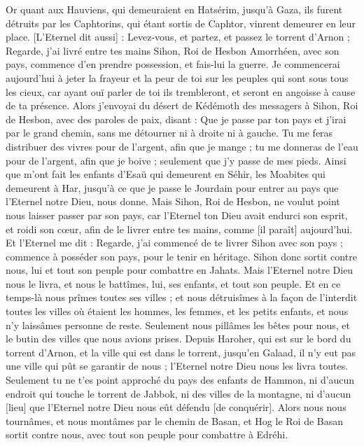 \begin{multicols}{2}
Or quant aux Hauviens, qui demeuraient en Hatsérim, jusqu'à Gaza, ils furent détruits par les Caphtorins, qui étant sortis de Caphtor, vinrent demeurer en leur place.
[L'Eternel dit aussi] : Levez-vous, et partez, et passez le torrent d'Arnon ; Regarde, j'ai livré entre tes mains Sihon, Roi de Hesbon Amorrhéen, avec son pays, commence d'en prendre possession, et fais-lui la guerre.
Je commencerai aujourd'hui à jeter la frayeur et la peur de toi sur les peuples qui sont sous tous les cieux, car ayant ouï parler de toi ils trembleront, et seront en angoisse à cause de ta présence.
Alors j'envoyai du désert de Kédémoth des messagers à Sihon, Roi de Hesbon, avec des paroles de paix, disant :
Que je passe par ton pays et j'irai par le grand chemin, sans me détourner ni à droite ni à gauche.
Tu me feras distribuer des vivres pour de l'argent, afin que je mange ; tu me donneras de l'eau pour de l'argent, afin que je boive ; seulement que j'y passe de mes pieds.
Ainsi que m'ont fait les enfants d'Esaü qui demeurent en Séhir, les Moabites qui demeurent à Har, jusqu'à ce que je passe le Jourdain pour entrer au pays que l'Eternel notre Dieu, nous donne.
Mais Sihon, Roi de Hesbon, ne voulut point nous laisser passer par son pays, car l'Eternel ton Dieu avait endurci son esprit, et roidi son cœur, afin de le livrer entre tes mains, comme [il paraît] aujourd'hui.
Et l'Eternel me dit : Regarde, j'ai commencé de te livrer Sihon avec son pays ; commence à posséder son pays, pour le tenir en héritage.
Sihon donc sortit contre nous, lui et tout son peuple pour combattre en Jahats.
Mais l'Eternel notre Dieu nous le livra, et nous le battîmes, lui, ses enfants, et tout son peuple.
Et en ce temps-là nous prîmes toutes ses villes ; et nous détruisîmes à la façon de l'interdit toutes les villes où étaient les hommes, les femmes, et les petits enfants, et nous n'y laissâmes personne de reste.
Seulement nous pillâmes les bêtes pour nous, et le butin des villes que nous avions prises.
Depuis Haroher, qui est sur le bord du torrent d'Arnon, et la ville qui est dans le torrent, jusqu'en Galaad, il n'y eut pas une ville qui pût se garantir de nous ; l'Eternel notre Dieu nous les livra toutes.
Seulement tu ne t'es point approché du pays des enfants de Hammon, ni d'aucun endroit qui touche le torrent de Jabbok, ni des villes de la montagne, ni d'aucun [lieu] que l'Eternel notre Dieu nous eût défendu [de conquérir].
\VerseOne{}Alors nous nous tournâmes, et nous montâmes par le chemin de Basan, et Hog le Roi de Basan sortit contre nous, avec tout son peuple pour combattre à Edréhi.

\end{multicols}
